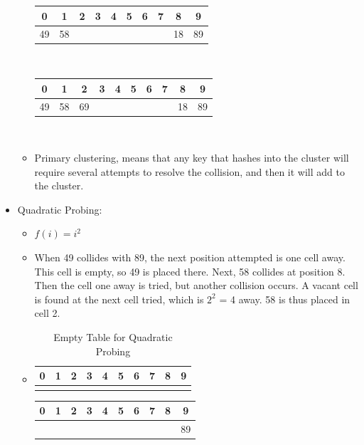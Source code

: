 \documentclass[a4paper,oneside]{book}
\begin{document}
\begin{itemize}
\begin{itemize}
\begin{tabular}[H]{|cccccccccc|}
\hline
0 & 1 & 2 & 3 & 4 & 5 & 6 & 7 & 8 & 9\\ \hline
 49 & 58 & & & & & & & 18 & 89 \\ \hline
\end{tabular}\\
\begin{tabular}[H]{|cccccccccc|}
\hline
0 & 1 & 2 & 3 & 4 & 5 & 6 & 7 & 8 & 9\\ \hline
49 & 58 & 69 & & & & & & 18 & 89\\ \hline
\end{tabular}\\
\item Primary clustering, means that any key that hashes into the cluster
will require several attempts to resolve the collision, and then it will add to the cluster.
\end{itemize}
\item Quadratic Probing:\begin{itemize}
  \item $f(i) = i^2$
  \item When 49 collides with 89, the next position attempted is one cell away. This cell is
empty, so 49 is placed there. Next, 58 collides at position 8. Then the cell one
away is tried, but another collision occurs. A vacant cell is found at the next cell tried, which is
$2^2$ = 4 away. 58 is thus placed in cell 2.
\item \begin{table}
\centering
\caption{Empty Table for Quadratic Probing}
\label{HashKeyLinearProbing}
\begin{tabular}{|cccccccccc|}
\hline
0 & 1 & 2 & 3 & 4 & 5 & 6 & 7 & 8 & 9\\ \hline
& & & & & & & & & \\ \hline
\end{tabular}
\end{table}
\begin{tabular}[H]{|cccccccccc|}
\hline
0 & 1 & 2 & 3 & 4 & 5 & 6 & 7 & 8 & 9\\ \hline
& & & & & & & & & 89\\ \hline
\end{tabular}

\end{itemize}
\end{itemize}
\end{document}
